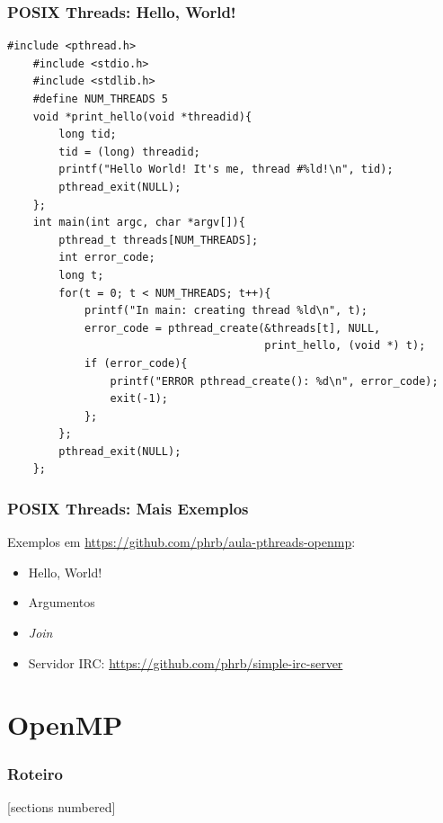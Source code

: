 \documentclass[10pt, compress]{beamer}
\begin{document}
\begin{frame}[fragile]
    \frametitle{POSIX Threads: Hello, World!}
    \begin{lstlisting}[basicstyle=\ttfamily\scriptsize]
    #include <pthread.h>
    #include <stdio.h>
    #include <stdlib.h>
    #define NUM_THREADS 5
    void *print_hello(void *threadid){
        long tid;
        tid = (long) threadid;
        printf("Hello World! It's me, thread #%ld!\n", tid);
        pthread_exit(NULL);
    };
    int main(int argc, char *argv[]){
        pthread_t threads[NUM_THREADS];
        int error_code;
        long t;
        for(t = 0; t < NUM_THREADS; t++){
            printf("In main: creating thread %ld\n", t);
            error_code = pthread_create(&threads[t], NULL,
                                        print_hello, (void *) t);
            if (error_code){
                printf("ERROR pthread_create(): %d\n", error_code);
                exit(-1);
            };
        };
        pthread_exit(NULL);
    };
    \end{lstlisting}
\end{frame}

\begin{frame}
    \frametitle{POSIX Threads: Mais Exemplos}
    Exemplos em \url{https://github.com/phrb/aula-pthreads-openmp}:
    \begin{itemize}
        \item Hello, World!
        \item Argumentos
        \item \textit{Join}
        \item Servidor IRC: \url{https://github.com/phrb/simple-irc-server}
    \end{itemize}
\end{frame}

\section{OpenMP}

\maketitle

\begin{frame}
    \frametitle{Roteiro}
    [sections numbered]
    \tableofcontents[hideallsubsections]
\end{frame}
\end{document}
